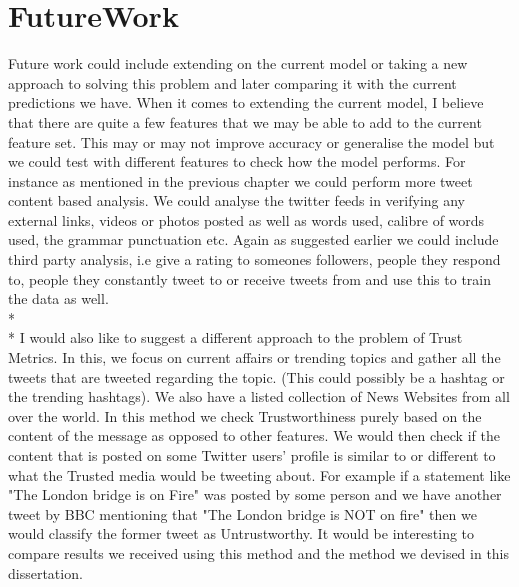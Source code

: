 \section{FutureWork}
Future work could include extending on the current model or taking a new approach to solving this problem and later comparing it with the current predictions we have. When it comes to extending the current model, I believe that there are quite a few features that we may be able to add to the current feature set. This may or may not improve accuracy or generalise the model but we could test with different features to check how the model performs. For instance as mentioned in the previous chapter we could perform more tweet content based analysis. We could analyse the twitter feeds in verifying any external links, videos or photos posted as well as words used, calibre of words used, the grammar punctuation etc.  Again as suggested earlier we could include third party analysis, i.e give a rating to someones followers, people they respond to, people they constantly tweet to or receive tweets from and use this to train the data as well. \\*\\*
I would also like to suggest a different approach to the problem of Trust Metrics. In this, we focus on current affairs or trending topics and gather all the tweets that are tweeted regarding the topic. (This could possibly be a hashtag or the trending hashtags). We also have a listed collection of News Websites from all over the world. In this method we check Trustworthiness purely based on the content of the message as opposed to other features. We would then check if the content that is posted on some Twitter users' profile is similar to or different to what the Trusted media would be tweeting about. For example if a statement like "The London bridge is on Fire" was posted by some person and we have another tweet by BBC mentioning that "The London bridge is NOT on fire" then we would classify the former tweet as Untrustworthy. It would be interesting to compare results we received using this method and the method we devised in this dissertation.